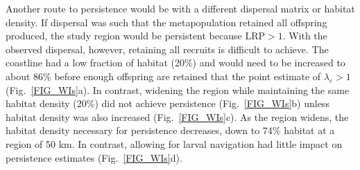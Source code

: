 \documentclass[12pt, oneside]{article}   	%
\begin{document}
Another route to persistence would be with a different dispersal matrix or habitat density. If dispersal was such that the metapopulation retained all offspring produced, the study region would be persistent because $\text{LRP} > 1$. With the observed dispersal, however, retaining all recruits is difficult to achieve. The coastline had a low fraction of habitat (20\%) and would need to be increased to about 86\% before enough offspring are retained that the point estimate of $\lambda_c > 1$ (Fig.\ \ref{FIG_WIs}a). In contrast, widening the region while maintaining the same habitat density (20\%) did not achieve persistence (Fig.\ \ref{FIG_WIs}b) unless habitat density was also increased (Fig.\ \ref{FIG_WIs}c). As the region widens, the habitat density necessary for persistence decreases, down to 74\% habitat at a region of 50 km. In contrast, allowing for larval navigation had little impact on persistence estimates (Fig.\ \ref{FIG_WIs}d).


\end{document}
